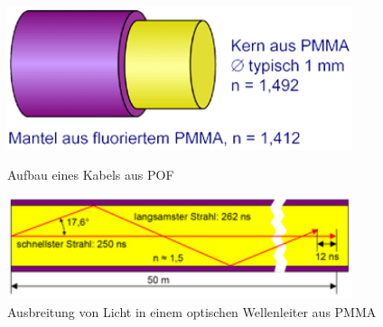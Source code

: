 \begin{figure}[h]
    \begin{center}
        \begin{minipage}[t]{0.4\textwidth}
            \begin{center}
                \includegraphics[width=0.9\textwidth]{Bilder/Optische_Wellenleiter_Die_Polymer_Optische_Faser/Funktionsweise/pofprinzip.png}
                \caption[Aufbau eines Kabels aus POF \newline \url{http://www.pofac.fh-nuernberg.de/pofac/de/was_sind_pof/images/pof_prinzip.png} (zuletzt aufgerufen am 19.09.2015)]{Aufbau eines Kabels aus POF}
                \label{fig:pofprinzip}
            \end{center}
        \end{minipage}
        \hspace{0.025\textwidth}
        \begin{minipage}[t]{0.4\textwidth}
            \begin{center}
                \includegraphics[width=0.9\textwidth]{Bilder/Optische_Wellenleiter_Die_Polymer_Optische_Faser/Funktionsweise/poflichtausbreitung.png}
                \caption[Ausbreitung von Licht in einem optischen Wellenleiter aus PMMA \newline \url{http://www.pofac.info/typo3temp/pics/7eee584dce.jpg} (zuletzt aufgerufen am 19.09.2015)]{Ausbreitung von Licht in einem optischen Wellenleiter aus PMMA}
                \label{fig:poflichtausbreitung}
            \end{center}
        \end{minipage}
    \end{center}
\end{figure}
